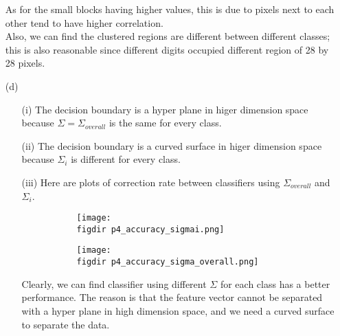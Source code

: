 \documentclass[11pt]{article}
\theoremstyle{quest}
\newcommand{\figdir}{../figures/}
\begin{document}
\begin{itemize}
As for the small blocks having higher values, this is due to pixels next to each other tend to have higher correlation.\\
Also, we can find the clustered regions are different between different classes; this is also reasonable since different digits occupied different region of 28 by 28 pixels.
\item[(d)]
	\begin{itemize}
	\item[(i)]
	The decision boundary is a hyper plane in higer dimension space because $\Sigma = \Sigma_{overall}$ is the same for every class.
	\item[(ii)]
	The decision boundary is a curved surface in higer dimension space because $\Sigma_{i}$ is different for every class.
	\item[(iii)]
	Here are plots of correction rate between classifiers using $\Sigma_{overall}$ and $\Sigma_{i}$.
	\begin{figure}[H]
	\centering
	\begin{subfigure}{.5\textwidth}
	  \centering
	  \texttt{[image: \\figdir p4\_accuracy\_sigmai.png]}
	\end{subfigure}%
	\begin{subfigure}{.5\textwidth}
	  \centering
	  \texttt{[image: \\figdir p4\_accuracy\_sigma\_overall.png]}
	\end{subfigure}
	\end{figure}
	Clearly, we can find classifier using different $\Sigma$ for each class has a better performance. The reason is that the feature vector
	cannot be separated with a hyper plane in high dimension space, and we need a curved surface to separate the data.
	\end{itemize}
\end{itemize}
\newpage
\end{document}
